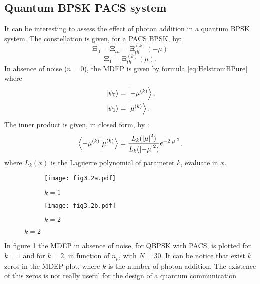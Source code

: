     \subsection{Quantum BPSK PACS system}
    It can be interesting to assess the effect of photon addition in a quantum BPSK system.
    The constellation is given, for a PACS BPSK, by:
    \begin{equation}
        \pmb{\Xi}_0 =  \pmb{\Xi}_{th} = \pmb{\Xi}_{th}^{(k)}(-\mu)
    \end{equation}
    \begin{equation*}
        \pmb{\Xi}_1 =  \pmb{\Xi}_{th}^{(k)}(\mu).
    \end{equation*}
    In absence of noise ($\bar{n}=0$), the MDEP is given by formula \ref{eq:HelstromBPure} where
    \begin{equation}
        \begin{split}
            &\ket{\psi_0}=\ket{-\mu^{(k)}},\\
            &\ket{\psi_1}=\ket{\mu^{(k)}}.
        \end{split}
    \end{equation}
    The inner product is given, in closed form, by \cite{PACSDisc}:
    \begin{equation}
        \braket{-\mu^{(k)}}{\mu^{(k)}} = \frac{L_k(\absolutevalue{\mu}^2)}{L_k(\absolutevalue{-\mu}^2)}
        e^{-2\absolutevalue{\mu}^2},
    \end{equation}
    where $L_k(x)$ is the Laguerre polynomial of parameter $k$, evaluate in $x$.
    \begin{figure}
        \caption{MDEP of quantum BPSK in absence of noise, $N=30$.}
        \begin{subfigure}{0.49\textwidth}
            \texttt{[image: fig3.2a.pdf]}
            \caption{$k=1$}
        \end{subfigure}
        \begin{subfigure}{0.49\textwidth}
            \texttt{[image: fig3.2b.pdf]}
            \caption{$k=2$}
        \end{subfigure}
        \label{fig:3.2}
    \end{figure}
    In figure \ref{fig:3.2} the MDEP in absence of noise, for QBPSK with PACS, is plotted for
    $k=1$ and for $k=2$, in function of $n_p$, with $N=30$. It can be notice that exist $k$ zeros
    in the MDEP plot, where $k$ is the number of photon addition.
    The existence of this zeros is not really useful for the design of a quantum communication
